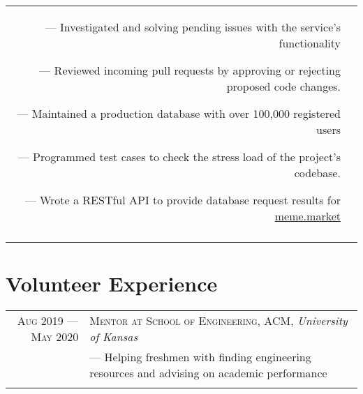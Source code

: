 \documentclass[letterpaper, 10pt]{article}
\begin{document}
\begin{tabular}{r|p{12cm}}
{		--- Investigated and solving pending issues with the service's functionality

		--- Reviewed incoming pull requests by approving or rejecting proposed code changes.

		--- Maintained a production database with over 100,000 registered users

		--- Programmed test cases to check the stress load of the project's codebase.

		--- Wrote a RESTful API to provide database request results for \href{https://meme.market}{meme.market}
	}                                                                                                                            \\\multicolumn{2}{c}{}\\
\end{tabular}

\section{Volunteer Experience}
\begin{tabular}{r|p{12cm}}

	\textsc{Aug 2019 --- May 2020} & \textsc{Mentor at School of Engineering, ACM}, \emph{University of Kansas} \\&\footnotesize{
		--- Helping freshmen with finding engineering resources and advising on academic performance
	}                                                                                                           \\\multicolumn{2}{c}{}\\
\end{tabular}
\end{document}
